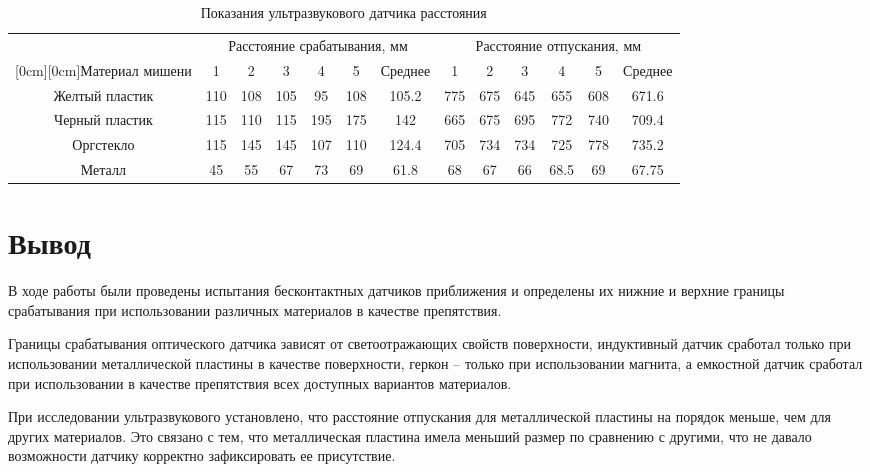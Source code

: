 \begin{table}[!h]
    \centering
    \caption{Показания ультразвукового датчика расстояния}
    \label{tab:5}
    \begin{tabular}{|c|c|c|c|c|c|c|c|c|c|c|c|c|}
        \hline
        & \multicolumn{6}{c|}{Расстояние срабатывания, мм} & \multicolumn{6}{c|}{Расстояние отпускания, мм}\\
        \cline{2-13}
        \raisebox{1.5ex}[0cm][0cm]{Материал мишени}
        & 1 & 2&3 &4 &5 & Среднее &1 &2 &3 &4 &5 &Среднее \\
        \hline
        Желтый пластик & 110&  108& 105& 95& 108& 105.2& 775& 675& 645& 655& 608& 671.6\\
        Черный пластик& 115& 110& 115& 195& 175& 142& 665& 675& 695& 772& 740& 709.4\\
        Оргстекло & 115& 145& 145& 107& 110& 124.4& 705& 734& 734& 725& 778& 735.2\\
        Металл & 45& 55& 67& 73& 69& 61.8& 68& 67& 66& 68.5& 69& 67.75\\
        \hline
    \end{tabular}
\end{table}

\section{Вывод}
В ходе работы были проведены испытания бесконтактных датчиков приближения и определены их нижние и верхние границы срабатывания при использовании различных материалов в качестве препятствия.

Границы срабатывания оптического датчика зависят от светоотражающих свойств поверхности,
индуктивный датчик сработал только при использовании металлической пластины в качестве поверхности, геркон -- только при использовании магнита, а емкостной датчик сработал при использовании в качестве препятствия всех доступных вариантов материалов.

При исследовании ультразвукового установлено, что расстояние отпускания для металлической пластины на порядок меньше, чем для других материалов.
Это связано с тем, что металлическая пластина имела меньший размер по сравнению с другими, что не давало возможности датчику корректно зафиксировать ее присутствие.